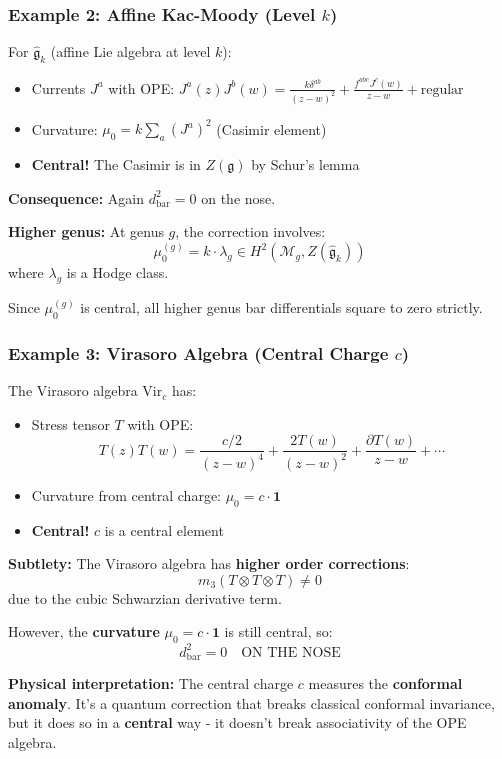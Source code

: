 \subsubsection{Example 2: Affine Kac-Moody (Level $k$)}

\begin{example}\label{ex:kac-moody-strict}
For $\widehat{\mathfrak{g}}_k$ (affine Lie algebra at level $k$):
\begin{itemize}
\item Currents $J^a$ with OPE: $J^a(z)J^b(w) = \frac{k \delta^{ab}}{(z-w)^2} 
+ \frac{f^{abc}J^c(w)}{z-w} + \text{regular}$
\item Curvature: $\mu_0 = k \sum_a (J^a)^2$ (Casimir element)
\item \textbf{Central!} The Casimir is in $Z(\mathfrak{g})$ by Schur's lemma
\end{itemize}

\textbf{Consequence:} Again $d_{\text{bar}}^2 = 0$ on the nose.

\textbf{Higher genus:}
At genus $g$, the correction involves:
$$\mu_0^{(g)} = k \cdot \lambda_g \in H^2(\mathcal{M}_g, Z(\widehat{\mathfrak{g}}_k))$$
where $\lambda_g$ is a Hodge class.

Since $\mu_0^{(g)}$ is central, all higher genus bar differentials square to zero strictly.
\end{example}

\subsubsection{Example 3: Virasoro Algebra (Central Charge $c$)}

\begin{example}\label{ex:virasoro-strict}
The Virasoro algebra $\text{Vir}_c$ has:
\begin{itemize}
\item Stress tensor $T$ with OPE: 
$$T(z)T(w) = \frac{c/2}{(z-w)^4} + \frac{2T(w)}{(z-w)^2} + \frac{\partial T(w)}{z-w} + \cdots$$
\item Curvature from central charge: $\mu_0 = c \cdot \mathbf{1}$
\item \textbf{Central!} $c$ is a central element
\end{itemize}

\textbf{Subtlety:} The Virasoro algebra has \textbf{higher order corrections}:
$$m_3(T \otimes T \otimes T) \neq 0$$
due to the cubic Schwarzian derivative term.

However, the \textbf{curvature} $\mu_0 = c \cdot \mathbf{1}$ is still central, so:
$$d_{\text{bar}}^2 = 0 \quad \text{ON THE NOSE}$$

\textbf{Physical interpretation:}
The central charge $c$ measures the \textbf{conformal anomaly}. It's a quantum correction 
that breaks classical conformal invariance, but it does so in a \textbf{central} way - 
it doesn't break associativity of the OPE algebra.
\end{example}

